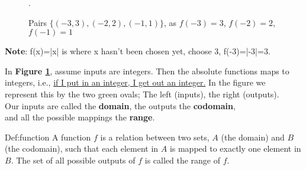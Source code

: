 \begin{figure}[ht]
    \centering
    \caption{\centering Pairs $\{(-3,3),(-2,2),(-1,1)\}$, as $f(-3)=3$, $f(-2)=2$, $f(-1)=1$}.
    \label{fig:relates}
\end{figure}

\begin{Note}
    \textbf{Note}: f(x)=|x| is where x hasn't been chosen yet, choose 3, f(-3)=|-3|=3.
\end{Note}

\noindent
In \textbf{Figure \ref{fig:relates}}, assume inputs are integers. Then the absolute functions maps to \\
integers, i.e., \underline{if I put in an integer, I get out an integer.} In the figure we\\
represent this by the two green ovals; The left (inputs), the right (outputs).\\

\noindent
Our inputs are called the \textbf{domain}, the outputs the \textbf{codomain},\\
and all the possible mappings the \textbf{range}.\\

\newpage

\begin{Def}[Function]{Def:function}
    A function $f$ is a relation between two sets, $A$ (the domain) and $B$ (the codomain),
    such that each element in $A$ is mapped to exactly one element
    in $B$. The set of all possible outputs of $f$ is called the range of $f$.
\end{Def}

